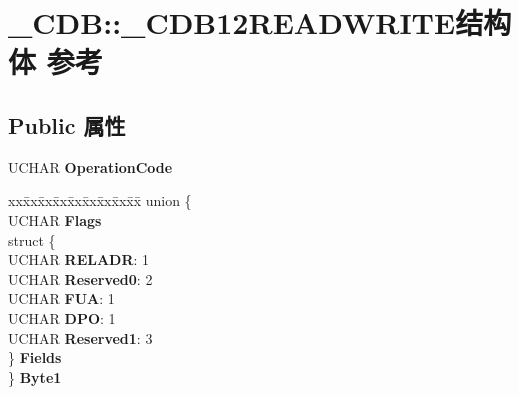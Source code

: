 \hypertarget{struct___c_d_b_1_1___c_d_b12_r_e_a_d_w_r_i_t_e}{}\section{\+\_\+\+C\+DB\+:\+:\+\_\+\+C\+D\+B12\+R\+E\+A\+D\+W\+R\+I\+T\+E结构体 参考}
\label{struct___c_d_b_1_1___c_d_b12_r_e_a_d_w_r_i_t_e}
\subsection*{Public 属性}
\begin{DoxyCompactItemize}
\item 
\mbox{\label{struct___c_d_b_1_1___c_d_b12_r_e_a_d_w_r_i_t_e_a3e04adc846faeb6bf58de6f857a8f159}} 
U\+C\+H\+AR {\bfseries Operation\+Code}
\item 
\mbox{\label{struct___c_d_b_1_1___c_d_b12_r_e_a_d_w_r_i_t_e_a78b0d77b4dc692de4cc971e28cebfa6d}} 
\begin{tabbing}
xx\=xx\=xx\=xx\=xx\=xx\=xx\=xx\=xx\=\kill
union \{\\
\>UCHAR {\bfseries Flags}\\
\>struct \{\\
\>\>UCHAR {\bfseries RELADR}: 1\\
\>\>UCHAR {\bfseries Reserved0}: 2\\
\>\>UCHAR {\bfseries FUA}: 1\\
\>\>UCHAR {\bfseries DPO}: 1\\
\>\>UCHAR {\bfseries Reserved1}: 3\\
\>\} {\bfseries Fields}\\
\} {\bfseries Byte1}\\


\end{tabbing}
\end{DoxyCompactItemize}
